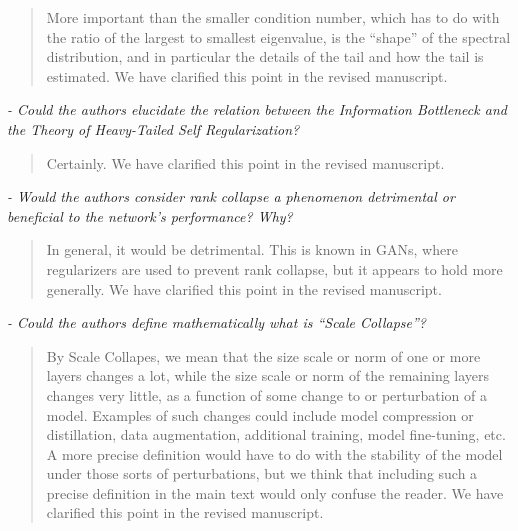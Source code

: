 \documentclass[11pt]{article}
\begin{document}
\begin{quote}
More important than the smaller condition number, which has to do with the ratio of the largest to smallest eigenvalue, is the ``shape'' of the spectral distribution, and in particular the details of the tail and how the tail is estimated.
We have clarified this point
in the revised manuscript.

\end{quote}

\noindent
\emph{%
- Could the authors elucidate the relation between the Information Bottleneck and the Theory of Heavy-Tailed Self Regularization?
}

\begin{quote}
Certainly.
We have clarified this point
in the revised manuscript.
\end{quote}

\noindent
\emph{%
- Would the authors consider rank collapse a phenomenon detrimental or beneficial to the network's performance? Why?
}

\begin{quote}
In general, it would be detrimental.
This is known in GANs, where regularizers are used to prevent rank collapse, but it appears to hold more generally.
We have clarified this point
in the revised manuscript.
\end{quote}

\noindent
\emph{%
- Could the authors define mathematically what is ``Scale Collapse''?
}

\begin{quote}
By Scale Collapes, we mean that the size scale or norm of one or more layers changes a lot, while the size scale or norm of the remaining layers changes very little, as a function of some change to or perturbation of a model.  
Examples of such changes could include model compression or distillation, data augmentation, additional training, model fine-tuning, etc.
A more precise definition would have to do with the stability of the model under those sorts of perturbations, but we think that including such a precise definition in the main text would only confuse the reader.
We have clarified this point
in the revised manuscript.
\end{quote}
\end{document}
